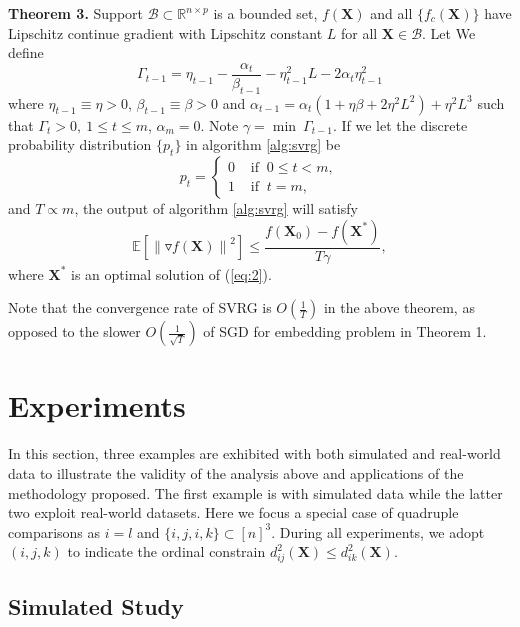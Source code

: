 \documentclass[letterpaper]{article}
\newcommand{\qqxu}[1]{\textcolor[rgb]{0.00,1.00,0.00}{#1}}
\begin{document}
		\textbf{Theorem 3.} Support $\mathcal{B}\subset\mathbb{R}^{n\times p}$ is a bounded set, $f(\mathbf{X})$ and all $\{f_c(\mathbf{X})\}$ have Lipschitz continue gradient with Lipschitz constant $L$ for all $\mathbf{X}\in\mathcal{B}$. Let We define
		$$
		\Gamma_{t-1} = \eta_{t-1}-\frac{\alpha_{t}}{\beta_{t-1}}-\eta^2_{t-1}L-2\alpha_{t}\eta^2_{t-1}
		$$
		where $\eta_{t-1}\equiv\eta>0$, $\beta_{t-1}\equiv\beta>0$ and $\alpha_{t-1}=\alpha_{t}(1+\eta\beta+2\eta^2L^2)+\eta^2L^3$ such that $\Gamma_t>0,\  1\leq t\leq m$, $\alpha_m=0$. Note $\gamma=\min\ \Gamma_{t-1}$. If we let the discrete probability distribution  $\{p_t\}$ in algorithm \ref{alg:svrg} be
		$$
		p_t=
		\begin{cases}
			0 & \text{ if }\ 0\leq t < m, \\
			1 & \text{ if }\ t = m,
		\end{cases}
		$$
		and $T\propto m$, the output of algorithm \ref{alg:svrg} will satisfy
		$$
			\mathbb{E}\left[\left\|\triangledown f(\mathbf{X})\right\|^2\right]\leq \frac{f(\mathbf{X}_0)-f(\mathbf{X}^*)}{T\gamma},
		$$
		where $\mathbf{X}^*$ is an optimal solution of (\ref{eq:2}).

		Note that the convergence rate of SVRG is $O(\frac{1}{T})$ in the above theorem, as opposed to the slower $O(\frac{1}{\sqrt{T}})$ of SGD for embedding problem in Theorem 1.

		\section{Experiments}

		\qqxu{In this section, three examples are exhibited with both simulated and real-world data to illustrate the validity of the analysis above and applications of the methodology proposed. The first example is with simulated data while the latter two exploit real-world datasets.} Here we focus a special case of quadruple comparisons as $i=l$ and $\{i,j,i,k\}\subset[n]^3$. During all experiments, we \qqxu{adopt} $(i,j,k)$ to indicate the ordinal constrain $d^2_{ij}(\mathbf{X})\leq d^2_{ik}(\mathbf{X})$. 

		\subsection{Simulated Study}
\end{document}
